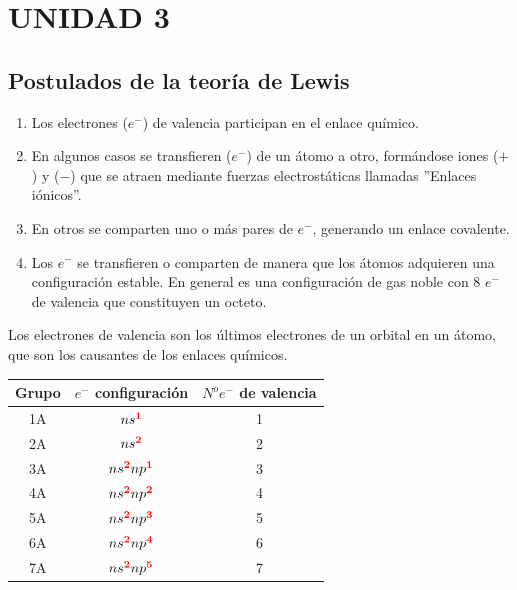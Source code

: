 \saltoPag{}
\section{UNIDAD 3}
    \subsection{Postulados de la teoría de Lewis}
        \begin{enumerate}
            \item Los electrones ($e^-$) de valencia participan en el enlace químico.
            \item En algunos casos se transfieren ($e^-$) de un átomo a otro, formándose iones ($+$) y ($-$) que se atraen mediante fuerzas electrostáticas llamadas ''Enlaces iónicos''.
            \item En otros se comparten uno o más pares de $e^-$, generando un enlace covalente.
            \item Los $e^-$ se transfieren o comparten de manera que los átomos adquieren una configuración estable. En general es una configuración de gas noble con 8 $e^-$ de valencia que constituyen un octeto.
        \end{enumerate}
        
        \sangria{} Los electrones de valencia son los últimos electrones de un orbital en un átomo, que son los causantes de los enlaces químicos.
        \begin{center} 
            \begin{tabular}{| c | c | c |}
                \toprule
                \textbf{Grupo} & \textbf{$e^-$ configuración} & \textbf{$N^o e^-$ de valencia} \\ 
                \midrule
                \midrule
                1A & $ns^\text{\textcolor{red}{\textbf{1}}}$ & 1 \\
                \midrule
                2A & $ns^\text{\textcolor{red}{\textbf{2}}}$ & 2 \\
                \midrule
                3A & $ns^\text{\textcolor{red}{\textbf{2}}}np^\text{\textcolor{red}{\textbf{1}}}$ & 3 \\
                \midrule
                4A & $ns^\text{\textcolor{red}{\textbf{2}}}np^\text{\textcolor{red}{\textbf{2}}}$ & 4 \\
                \midrule
                5A & $ns^\text{\textcolor{red}{\textbf{2}}}np^\text{\textcolor{red}{\textbf{3}}}$ & 5 \\
                \midrule
                6A & $ns^\text{\textcolor{red}{\textbf{2}}}np^\text{\textcolor{red}{\textbf{4}}}$ & 6 \\
                \midrule
                7A & $ns^\text{\textcolor{red}{\textbf{2}}}np^\text{\textcolor{red}{\textbf{5}}}$ & 7 \\
                \bottomrule
            \end{tabular}
        \end{center}

